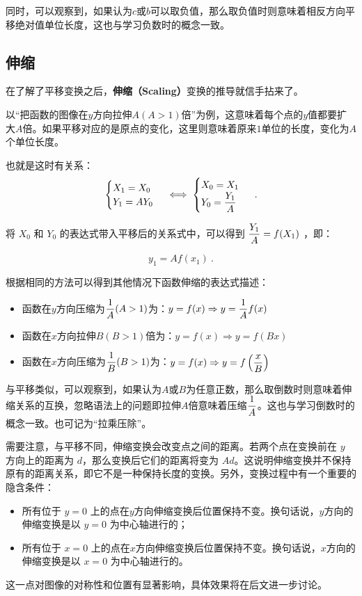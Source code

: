 同时，可以观察到，如果认为$c$或$b$可以取负值，那么取负值时则意味着相反方向平移绝对值单位长度，这也与学习负数时的概念一致。

\subsection{伸缩}\label{sub_FunTra_2}

在了解了平移变换之后，\textbf{伸缩（Scaling）}变换的推导就信手拈来了。

以“把函数的图像在$y$方向拉伸$A(A>1)$倍”为例，这意味着每个点的$y$值都要扩大$A$倍。如果平移对应的是原点的变化，这里则意味着原来$1$单位的长度，变化为$A$个单位长度。

也就是这时有关系：
\begin{equation}
\begin{cases}
X_1=X_0\\
Y_1=AY_0
\end{cases}\iff
\begin{cases}
X_0=X_1\\
\displaystyle Y_0={Y_1\over A}
\end{cases}~.
\end{equation}

将  $X_0$  和  $Y_0$  的表达式带入平移后的关系式中，可以得到  $\displaystyle{Y_1\over A} = f(X_1 )$ ，即：

\begin{equation}
y_1=Af(x_1)~.
\end{equation}

根据相同的方法可以得到其他情况下函数伸缩的表达式描述：

\begin{itemize}
\item 函数在$y$方向压缩为$\displaystyle{1\over A}(A>1)$为：$\displaystyle y=f(x)\Rightarrow y={1\over A}f(x)$
\item 函数在$x$方向拉伸$B(B>1)$倍为：$y=f(x)\Rightarrow y=f(Bx)$
\item 函数在$x$方向压缩为$\displaystyle{1\over B}(B>1)$为：$\displaystyle y=f(x)\Rightarrow y=f\left({x\over B}\right)$
\end{itemize}

与平移类似，可以观察到，如果认为$A$或$B$为任意正数，那么取倒数时则意味着伸缩关系的互换，忽略语法上的问题即拉伸$A$倍意味着压缩$\displaystyle {1\over A}$。这也与学习倒数时的概念一致。也可记为“拉乘压除”。

需要注意，与平移不同，伸缩变换会改变点之间的距离。若两个点在变换前在 $y$ 方向上的距离为 $d$，那么变换后它们的距离将变为 $A d$。这说明伸缩变换并不保持原有的距离关系，即它不是一种保持长度的变换。另外，变换过程中有一个重要的隐含条件：
\begin{itemize}
\item 所有位于 $y = 0$ 上的点在$y$方向伸缩变换后位置保持不变。换句话说，$y$方向的伸缩变换是以 $y = 0$ 为中心轴进行的；
\item 所有位于 $x = 0$ 上的点在$x$方向伸缩变换后位置保持不变。换句话说，$x$方向的伸缩变换是以 $x = 0$ 为中心轴进行的。
\end{itemize}
这一点对图像的对称性和位置有显著影响，具体效果将在后文进一步讨论。

